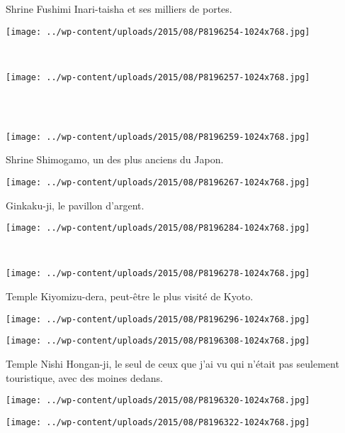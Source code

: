  Shrine Fushimi Inari-taisha et ses milliers de portes.
\begin{center} \texttt{[image: ../wp-content/uploads/2015/08/P8196254-1024x768.jpg]} \end{center}
\vspace{-\topsep}
\pagebreak
~\\
\begin{center} \texttt{[image: ../wp-content/uploads/2015/08/P8196257-1024x768.jpg]} \end{center}
~\\

~
\begin{center} \texttt{[image: ../wp-content/uploads/2015/08/P8196259-1024x768.jpg]} \end{center}
\vspace{-\topsep}
\pagebreak
 
 Shrine Shimogamo, un des plus anciens du Japon.
\begin{center} \texttt{[image: ../wp-content/uploads/2015/08/P8196267-1024x768.jpg]} \end{center}

 Ginkaku-ji, le pavillon d'argent.
\begin{center} \texttt{[image: ../wp-content/uploads/2015/08/P8196284-1024x768.jpg]} \end{center}
\vspace{-\topsep}
\pagebreak
~
\begin{center} \texttt{[image: ../wp-content/uploads/2015/08/P8196278-1024x768.jpg]} \end{center}

 Temple Kiyomizu-dera, peut-être le plus visité de Kyoto.
\begin{center} \texttt{[image: ../wp-content/uploads/2015/08/P8196296-1024x768.jpg]} \end{center}
\begin{center} \texttt{[image: ../wp-content/uploads/2015/08/P8196308-1024x768.jpg]} \end{center}

 Temple Nishi Hongan-ji, le seul de ceux que j'ai vu qui n'était pas seulement touristique, avec des moines dedans.
\begin{center} \texttt{[image: ../wp-content/uploads/2015/08/P8196320-1024x768.jpg]} \end{center}
\begin{center} \texttt{[image: ../wp-content/uploads/2015/08/P8196322-1024x768.jpg]} \end{center}

